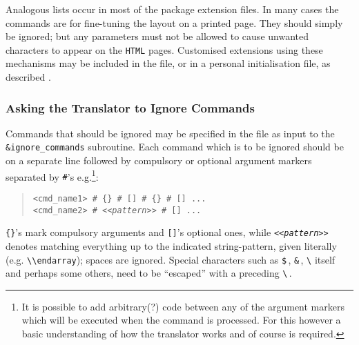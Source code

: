 Analogous lists occur in most of the package extension files.
In many cases the commands are for fine-tuning the layout on
a printed page. They should simply be ignored; but any parameters
must not be allowed to cause unwanted characters to appear on
the \texttt{HTML} pages.
Customised extensions using these mechanisms may be included in the 
 file, or in a personal 
 initialisation file, 
as described .



\subsubsection{Asking the Translator to Ignore Commands\label{ignore}}
\html{\\}%
Commands that should be ignored may be specified in the 
file as input to the \verb|&ignore_commands| subroutine. 
Each command which is to be ignored should be on a separate line 
followed by compulsory or optional argument markers separated by 
{\verb|#|}'s e.g.\footnote{It is possible to add arbitrary(?) \Perl{} code
between any of the argument markers which will be executed when 
the command is processed. For this however a basic understanding of
how the translator works and of course \Perl{} is required.}:
\begin{quote}
\begin{small}
\verb|<cmd_name1> # {} # [] # {} # [] ...|\\
\verb|<cmd_name2> # |\texttt{<<\emph{pattern}>>}\verb| # [] ...|
\end{small}
\end{quote}
\verb|{}|'s mark compulsory arguments and \verb|[]|'s optional ones,
while \texttt{<<\emph{pattern}>>} denotes matching everything up to the
indicated string-pattern, given literally (e.g. \verb|\\endarray|);
spaces are ignored. Special characters
such as \verb|$|\,, \verb|&|\,, \verb|\| itself and perhaps some others,
need to be ``escaped'' with a preceding \verb|\|\,.


\html{\\}%

